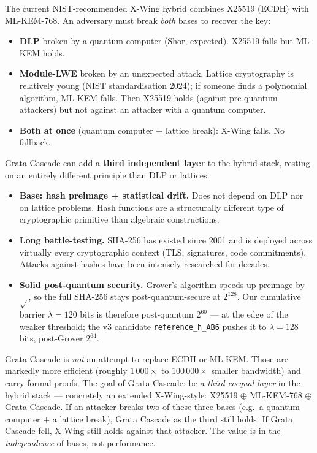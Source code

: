 \documentclass[11pt,a4paper]{article}
\begin{document}
The current NIST-recommended X-Wing hybrid combines X25519 (ECDH) with ML-KEM-768. An adversary must break \emph{both} bases to recover the key:

\begin{itemize}[leftmargin=*]
\item \textbf{DLP} broken by a quantum computer (Shor, expected). X25519 falls but ML-KEM holds.
\item \textbf{Module-LWE} broken by an unexpected attack. Lattice cryptography is relatively young (NIST standardisation 2024); if someone finds a polynomial algorithm, ML-KEM falls. Then X25519 holds (against pre-quantum attackers) but not against an attacker with a quantum computer.
\item \textbf{Both at once} (quantum computer $+$ lattice break): X-Wing falls. No fallback.
\end{itemize}

Grata Cascade can add a \textbf{third independent layer} to the hybrid stack, resting on an entirely different principle than DLP or lattices:

\begin{itemize}[leftmargin=*]
\item \textbf{Base: hash preimage + statistical drift.} Does not depend on DLP nor on lattice problems. Hash functions are a structurally different type of cryptographic primitive than algebraic constructions.
\item \textbf{Long battle-testing.} SHA-256 has existed since 2001 and is deployed across virtually every cryptographic context (TLS, signatures, code commitments). Attacks against hashes have been intensely researched for decades.
\item \textbf{Solid post-quantum security.} Grover's algorithm speeds up preimage by $\sqrt{}$, so the full SHA-256 stays post-quantum-secure at $2^{128}$. Our cumulative barrier $\lambda = 120$ bits is therefore post-quantum $2^{60}$ --- at the edge of the weaker threshold; the v3 candidate \texttt{reference\_h\_AB6} pushes it to $\lambda = 128$ bits, post-Grover $2^{64}$.
\end{itemize}

\begin{aha}
Grata Cascade is \emph{not} an attempt to replace ECDH or ML-KEM. Those are markedly more efficient (roughly $1\,000\times$ to $100\,000\times$ smaller bandwidth) and carry formal proofs. The goal of Grata Cascade: be a \emph{third coequal layer} in the hybrid stack --- concretely an extended X-Wing-style: X25519 $\oplus$ ML-KEM-768 $\oplus$ Grata Cascade. If an attacker breaks two of these three bases (e.g.\ a quantum computer $+$ a lattice break), Grata Cascade as the third still holds. If Grata Cascade fell, X-Wing still holds against that attacker. The value is in the \emph{independence} of bases, not performance.
\end{aha}
\end{document}
